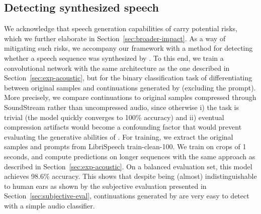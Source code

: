 \documentclass[letterpaper,10 pt]{IEEEtran}
\begin{document}
\subsection{Detecting synthesized speech} \label{sec:detecting-synthesis}
We acknowledge that speech generation capabilities of \ours{} carry potential risks, which we further elaborate in Section~\ref{sec:broader-impact}. 
As a way of mitigating such risks, we accompany our framework with a method for detecting whether a speech sequence was synthesized by \ours{}.
To this end, we train a convolutional network with the same architecture as the one described in Section~\ref{sec:exp-acoustic}, but for the binary classification task of differentiating between original samples and continuations generated by \ours{} (excluding the prompt). More precisely, we compare continuations to original samples compressed through SoundStream rather than uncompressed audio, since otherwise i) the task is trivial (the model quickly converges to 100\% accuracy) and ii) eventual compression artifacts would become a confounding factor that would prevent evaluating the generative abilities of \ours{}. For training, we extract the original samples and prompts from LibriSpeech train-clean-100. We train on crops of 1 seconds, and compute predictions on longer sequences with the same approach as described in Section~\ref{sec:exp-acoustic}. On a balanced evaluation set, this model achieves 98.6\% accuracy. This shows that despite being (almost) indistinguishable to human ears as shown by the subjective evaluation presented in Section~\ref{sec:subjective-eval}, continuations generated by \ours{} are very easy to detect with a simple audio classifier.
\end{document}
